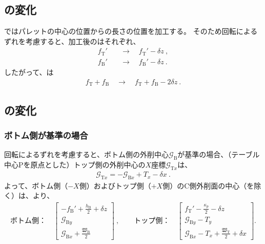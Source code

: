 \subsection{\WorkTotalLength の変化}
\EndFacecutMilling ではパレットの中心の位置から\ReAlocationLength の長さの位置を加工する。
そのため回転によるずれを考慮すると、加工後の\ReAlocationLength はそれぞれ、
\begin{align*}
  f_\mathrm T' &\quad\longrightarrow\quad f_\mathrm T'-\delta z\ ,\\
  f_\mathrm B' &\quad\longrightarrow\quad f_\mathrm B'-\delta z\ .
\end{align*}
したがって、\WorkTotalLength は
\begin{align*}
  f_\mathrm T+f_\mathrm B \quad\longrightarrow\quad f_\mathrm T+f_\mathrm B-2\delta z\ .
\end{align*}


\clearpage
\subsection{\CenterlineEndFaceDif の変化}

\subsubsection{ボトム側が基準の場合}
回転によるずれを考慮すると、ボトム側の外削中心$\mathcal G_\mathrm B$が基準の場合、（テーブル中心Pを原点とした）トップ側の外削中心の$X$座標$\mathcal G_{\mathrm Tx}$は、
\begin{align*}
  \mathcal G_{\mathrm Tx} = -\mathcal G_{\mathrm Bx}+T_x-\delta x\ .
\end{align*}
よって、ボトム側（$-X$側）およびトップ側（$+X$側）のC側外削面の中心（\Keyway を除く）は、より、
\begin{align*}
  \text{ボトム側：}\quad
  \left[
    \begin{array}{c}
      \displaystyle -f_\mathrm B'+\frac{h_\mathrm B}2+\delta z\\[5pt]
      \mathcal G_{\mathrm By}\\[3pt]
      \displaystyle \mathcal G_{\mathrm Bx}+\frac{\mathfrak W_\mathrm B}2
    \end{array}
    \right]~, \qquad
  \text{トップ側：}\quad
  \left[
    \begin{array}{c}
      \displaystyle f_\mathrm T'-\frac{\kappa_p}2-\delta z\\[5pt]
      \mathcal G_{\mathrm By}-T_y\\[3pt]
      \displaystyle \mathcal G_{\mathrm Bx}-T_x+\frac{\mathfrak W_\mathrm T}2+\delta x
    \end{array}
  \right].
\end{align*}


